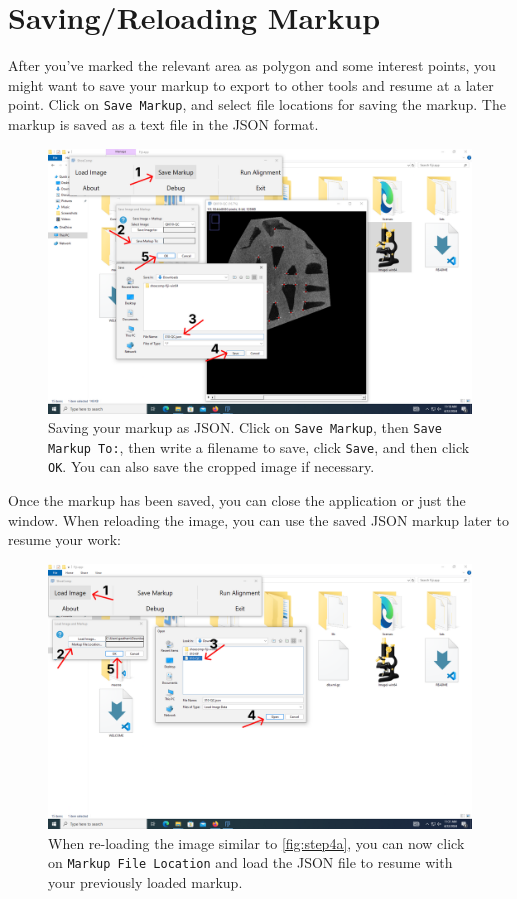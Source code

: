 \documentclass{csafedoc}
\begin{document}
\section{Saving/Reloading Markup}

After you've marked the relevant area as polygon and some interest points, you might want
to save your markup to export to other tools and resume at a later point. Click on
\texttt{Save Markup}, and select file locations for saving the markup. The markup is saved
as a text file in the JSON format.

\begin{figure}[H]
	\begin{center}
		\includegraphics[width=0.8\linewidth]{images/step_5a-anno.png}
	\end{center}
	\caption{Saving your markup as JSON. Click on \texttt{Save Markup}, then \texttt{Save
			Markup To:}, then write a filename to save, click \texttt{Save}, and then click
		\texttt{OK}. You can also save the cropped image if necessary.}
	\label{fig:step5a}
\end{figure}

Once the markup has been saved, you can close the application or just the window. When
reloading the image, you can use the saved JSON markup later to resume your work:

\begin{figure}[H]
	\begin{center}
		\includegraphics[width=0.8\linewidth]{images/step_5b-anno.png}
	\end{center}
	\caption{When re-loading the image similar to \autoref{fig:step4a}, you can now click on \texttt{Markup File Location} and load the JSON file to resume with your previously loaded markup.}
	\label{fig:step5b}
\end{figure}
\end{document}
